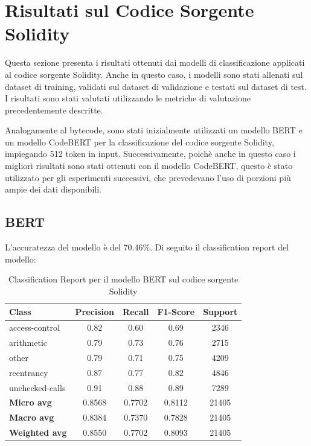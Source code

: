 \documentclass[../../Thesis.tex]{subfiles}
\begin{document}
\section{Risultati sul Codice Sorgente Solidity}

Questa sezione presenta i risultati ottenuti dai modelli di classificazione applicati al codice sorgente Solidity. Anche in questo caso, i modelli sono stati allenati sul dataset di training, validati sul dataset di validazione e testati sul dataset di test. I risultati sono stati valutati utilizzando le metriche di valutazione precedentemente descritte.

Analogamente al bytecode, sono stati inizialmente utilizzati un modello BERT e un modello CodeBERT per la classificazione del codice sorgente Solidity, impiegando 512 token in input. Successivamente, poich\`e anche in questo caso i migliori risultati sono stati ottenuti con il modello CodeBERT, questo \`e stato utilizzato per gli esperimenti successivi, che prevedevano l'uso di porzioni pi\`u ampie dei dati disponibili.
\subsection{BERT}
L'accuratezza del modello \`e del 70.46\%. Di seguito il classification report del modello:
\begin{table}[H]
    \centering
    \small
    \begin{tabular}{lcccc}
    \hline
    \textbf{Class} & \textbf{Precision} & \textbf{Recall} & \textbf{F1-Score} & \textbf{Support} \\
    \hline
    access-control & 0.82 & 0.60 & 0.69 & 2346 \\
    arithmetic & 0.79 & 0.73 & 0.76 & 2715 \\
    other & 0.79 & 0.71 & 0.75 & 4209 \\
    reentrancy & 0.87 & 0.77 & 0.82 & 4846 \\
    unchecked-calls & 0.91 & 0.88 & 0.89 & 7289 \\
    \hline
    \textbf{Micro avg} & 0.8568 & 0.7702 & 0.8112 & 21405 \\
    \textbf{Macro avg} & 0.8384 & 0.7370 & 0.7828 & 21405 \\
    \textbf{Weighted avg} & 0.8550 & 0.7702 & 0.8093 & 21405 \\
    \hline
    \end{tabular}
    \caption{Classification Report per il modello BERT sul codice sorgente Solidity}
\end{table}
\end{document}
